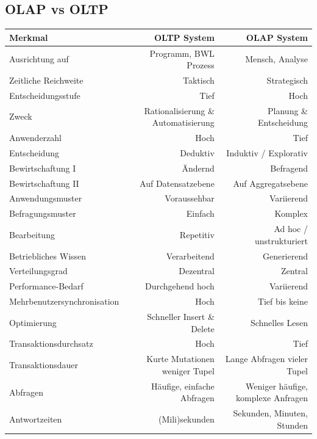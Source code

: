 \documentclass[a4paper, 11pt]{article}
\begin{document}
\begin{landscape}
\subsection{OLAP vs OLTP}
	
	\centering
	
	\begin{tabular}[htbp]{|l|r|r|}
		\hline 
		Merkmal & OLTP System  & OLAP System  \\ 
		\hline 
		Ausrichtung auf & Programm, BWL Prozess & Mensch, Analyse\\ 
		\hline 
		Zeitliche Reichweite & Taktisch & Strategisch \\ 
		\hline 
		Entscheidungsstufe & Tief & Hoch \\ 
		\hline
		Zweck & Rationalisierung \& Automatisierung & Planung \& Entscheidung \\
		\hline
		Anwenderzahl &Hoch & Tief \\
		\hline
		Entscheidung & Deduktiv & Induktiv / Explorativ \\
		\hline
		Bewirtschaftung I & Ändernd & Befragend \\
		\hline
		Bewirtschaftung II & Auf Datensatzebene & Auf Aggregatsebene \\
		\hline
		Anwendungsmuster & Voraussehbar & Variierend \\
		\hline
		Befragungsmuster & Einfach & Komplex \\
		\hline
		Bearbeitung & Repetitiv & Ad hoc / unstrukturiert \\
		\hline
		Betriebliches Wissen & Verarbeitend & Generierend \\
		\hline
		Verteilungsgrad & Dezentral & Zentral \\
		\hline
		Performance-Bedarf & Durchgehend hoch & Variierend \\
		\hline
		Mehrbenutzersynchronisation & Hoch & Tief bis keine \\
		\hline
		Optimierung & Schneller Insert \& Delete & Schnelles Lesen \\
		\hline
		Transaktionsdurchsatz & Hoch & Tief \\
		\hline
		Transaktionsdauer & Kurte Mutationen weniger Tupel & Lange Abfragen vieler Tupel \\
		\hline
		Abfragen & Häufige, einfache Abfragen & Weniger häufige, komplexe Anfragen \\
		\hline
		Antwortzeiten & (Mili)sekunden & Sekunden, Minuten, Stunden \\

\end{tabular}
\end{landscape}
\end{document}
